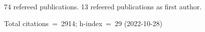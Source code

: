74 refereed publications. 13 refeered publications as first author.

Total citations~=~2914; h-index~=~29 (2022-10-28)
